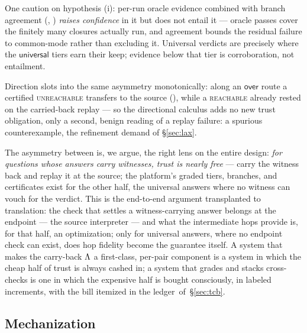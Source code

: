 One caution on hypothesis (i): per-run oracle evidence combined with
branch agreement (, ) \emph{raises
confidence} in it but does not entail it --- oracle passes cover the
finitely many closures actually run, and agreement bounds the residual
failure to common-mode rather than excluding it. Universal verdicts are
precisely where the $\mathsf{universal}$ tiers earn their keep; evidence
below that tier is corroboration, not entailment.

Direction slots into the same asymmetry monotonically: along an
$\mathsf{over}$ route a certified \textsc{unreachable} transfers to the
source (), while a \textsc{reachable} already rested on
the carried-back replay --- so the directional calculus adds no new
trust obligation, only a second, benign reading of a replay failure:
a spurious counterexample, the refinement demand of \S\ref{sec:lax}.

The asymmetry between  is, we argue,
the right lens on the entire design: \emph{for questions whose answers
carry witnesses, trust is nearly free} --- carry the witness back and
replay it at the source; the platform's graded tiers, branches, and
certificates exist for the other half, the universal answers where no
witness can vouch for the verdict. This is the end-to-end argument
\citep{saltzer1984endtoend} transplanted to translation: the check that
settles a witness-carrying answer belongs at the endpoint --- the
source interpreter --- and what the intermediate hops provide is, for
that half, an optimization; only for universal answers, where no
endpoint check can exist, does hop fidelity become the guarantee
itself. A system that makes the carry-back
$\Lambda$ a first-class, per-pair component is a system in which the cheap
half of trust is always cashed in; a system that grades and stacks
cross-checks is one in which the expensive half is bought consciously,
in labeled increments, with the bill itemized in the
ledger~of~\S\ref{sec:tcb}.

\subsection{Mechanization}
\label{sec:mech}

